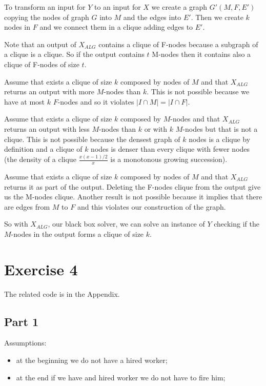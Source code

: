 \documentclass[paper=a4, fontsize=11pt]{scrartcl} %
\numberwithin{equation}{section} %
\numberwithin{figure}{section} %
\numberwithin{table}{section} %
\begin{document}
To transform an input for $Y$ to an input for $X$ we create a graph $G'(M, F, E')$ copying the nodes of graph $G$ into $M$ and the edges into $E'$. Then we create $k$ nodes in $F$ and we connect them in a clique adding edges to $E'$.

Note that an output of $X_{ALG}$ contains a clique of F-nodes because a subgraph of a clique is a clique. So if the output contains $t$ M-nodes then it contains also a clique of F-nodes of size $t$.

Assume that exists a clique of size $k$ composed by nodes of $M$ and that $X_{ALG}$ returns an output with more $M$-nodes than $k$.
This is not possible because we have at most $k$ $F$-nodes and so it violates $|I \cap M| = |I \cap F|$.

Assume that exists a clique of size $k$ composed by $M$-nodes and that $X_{ALG}$ returns an output with less $M$-nodes than $k$ or with $k$ $M$-nodes but that is not a clique.
This is not possible because the densest graph of $k$ nodes is a clique by definition and a clique of $k$ nodes is denser than every clique with fewer nodes (the density of a clique $\frac{x(x-1)/2}{x}$ is a monotonous growing succession).

Assume that exists a clique of size $k$ composed by nodes of $M$ and that $X_{ALG}$ returns it as part of the output.
Deleting the F-nodes clique from the output give us the M-nodes clique.
Another result is not possible because it implies that there are edges from $M$ to $F$ and this violates our construction of the graph.

So with $X_{ALG}$, our black box solver, we can solve an instance of $Y$ checking if the $M$-nodes in the output forms a clique of size $k$.

\bigskip
\section*{Exercise 4}

The related code is in the Appendix.

\subsection*{Part 1}

Assumptions:
\begin{itemize}
    \item at the beginning we do not have a hired worker;
    \item at the end if we have and hired worker we do not have to fire him;
\end{itemize}
\end{document}
